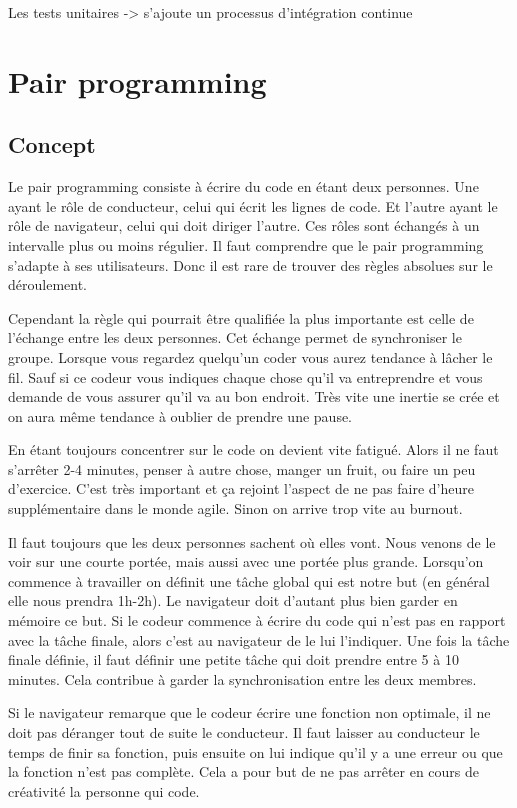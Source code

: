 \documentclass[journal, a4paper, frenchb]{IEEEtran}
\begin{document}
Les tests unitaires -> s'ajoute un processus d'intégration continue



\section{Pair programming}
\subsection{Concept}
Le pair programming consiste à écrire du code en étant deux personnes. Une ayant le rôle de
conducteur, celui qui écrit les lignes de code. Et l’autre ayant le rôle de navigateur, celui qui doit
diriger l’autre. Ces rôles sont échangés à un intervalle plus ou moins régulier. Il faut comprendre que
le pair programming s’adapte à ses utilisateurs. Donc il est rare de trouver des règles absolues sur le
déroulement.

Cependant la règle qui pourrait être qualifiée la plus importante est celle de l’échange entre les deux
personnes. Cet échange permet de synchroniser le groupe. Lorsque vous regardez quelqu’un coder
vous aurez tendance à lâcher le fil. Sauf si ce codeur vous indiques chaque chose qu’il va
entreprendre et vous demande de vous assurer qu’il va au bon endroit. Très vite une inertie se crée
et on aura même tendance à oublier de prendre une pause.

En étant toujours concentrer sur le code on devient vite fatigué. Alors il ne faut s’arrêter 2-4 minutes,
penser à autre chose, manger un fruit, ou faire un peu d’exercice. C’est très important et ça rejoint
l’aspect de ne pas faire d’heure supplémentaire dans le monde agile. Sinon on arrive trop vite au
burnout.

Il faut toujours que les deux personnes sachent où elles vont. Nous venons de le voir sur une courte
portée, mais aussi avec une portée plus grande. Lorsqu’on commence à travailler on définit une
tâche global qui est notre but (en général elle nous prendra 1h-2h). Le navigateur doit d’autant plus
bien garder en mémoire ce but. Si le codeur commence à écrire du code qui n’est pas en rapport
avec la tâche finale, alors c’est au navigateur de le lui l’indiquer. Une fois la tâche finale définie, il faut
définir une petite tâche qui doit prendre entre 5 à 10 minutes. Cela contribue à garder la
synchronisation entre les deux membres.

Si le navigateur remarque que le codeur écrire une fonction non optimale, il ne doit pas déranger
tout de suite le conducteur. Il faut laisser au conducteur le temps de finir sa fonction, puis ensuite on
lui indique qu’il y a une erreur ou que la fonction n’est pas complète. Cela a pour but de ne pas
arrêter en cours de créativité la personne qui code.
\end{document}
